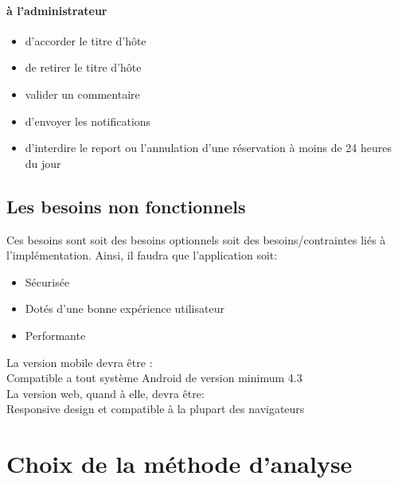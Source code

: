 \paragraph{à l’administrateur}
\begin{itemize}
\item[\textbullet] d’accorder le titre d’hôte
\item[\textbullet] de retirer le titre d’hôte
\item[\textbullet] valider un commentaire
\item[\textbullet] d’envoyer les notifications
\item[\textbullet] d’interdire le report ou l’annulation d’une réservation à moins de 24 heures du jour
\end{itemize} 


\subsection{Les besoins non fonctionnels} 
Ces besoins sont soit des besoins optionnels soit des besoins/contraintes liés à l’implémentation. Ainsi, il faudra que l’application soit:
\begin{itemize}
\item[\textbullet] Sécurisée
\item[\textbullet] Dotés d’une bonne expérience utilisateur
\item[\textbullet] Performante
\end{itemize}

La version mobile devra être :
\\Compatible a tout système Android de version minimum 4.3
\\La version web, quand à elle, devra être:
\\Responsive design et compatible à la plupart des navigateurs
\newpage
\section{Choix de la méthode d'analyse} 

